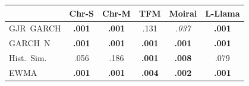 \begin{tabular}{@{}lccccc@{}}
\toprule
 & Chr-S & Chr-M & TFM & Moirai & L-Llama \\
\midrule
GJR~GARCH & \textbf{.001} & \textbf{.001} & .131 & \textit{.037} & \textbf{.001} \\
GARCH~N & \textbf{.001} & \textbf{.001} & \textbf{.001} & \textbf{.001} & \textbf{.001} \\
Hist.\ Sim. & .056 & .186 & \textbf{.001} & \textbf{.008} & .079 \\
EWMA & \textbf{.001} & \textbf{.001} & \textbf{.004} & \textbf{.002} & \textbf{.001} \\
\bottomrule
\end{tabular}
